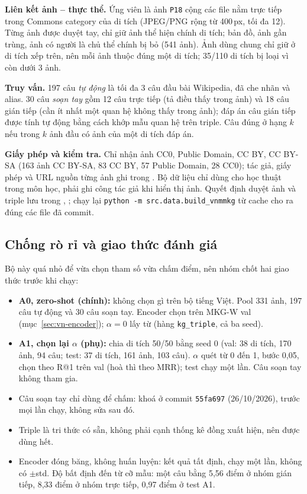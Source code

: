 \textbf{Liên kết ảnh -- thực thể.} Ứng viên là ảnh \texttt{P18} cộng các file nằm trực tiếp trong Commons category
của di tích (JPEG/PNG rộng từ 400\,px, tối đa 12). Từng ảnh được duyệt tay, chỉ giữ ảnh thể hiện chính di tích;
bản đồ, ảnh gần trùng, ảnh có người là chủ thể chính bị bỏ (541 ảnh). Ảnh dùng chung chỉ giữ ở di tích xếp trên,
nên mỗi ảnh thuộc đúng một di tích; 35/110 di tích bị loại vì còn dưới 3 ảnh.

\textbf{Truy vấn.} 197 câu \emph{tự động} là tối đa 3 câu đầu bài Wikipedia, đã che nhãn và alias. 30 câu
\emph{soạn tay} gồm 12 câu trực tiếp (tả điều thấy trong ảnh) và 18 câu gián tiếp (cần ít nhất một quan hệ không
thấy trong ảnh); đáp án câu gián tiếp được tính tự động bằng cách khớp mẫu quan hệ trên triple. Câu đúng ở hạng
$k$ nếu trong $k$ ảnh đầu có ảnh của một di tích đáp án.

\textbf{Giấy phép và kiểm tra.} Chỉ nhận ảnh CC0, Public Domain, CC BY, CC BY-SA (163 ảnh CC BY-SA, 83 CC BY, 57
Public Domain, 28 CC0); tác giả, giấy phép và URL nguồn từng ảnh ghi trong . Bộ dữ liệu chỉ
dùng cho học thuật trong môn học, phải ghi công tác giả khi hiển thị ảnh. Quyết định duyệt ảnh và triple lưu
trong , ; chạy lại \texttt{python -m src.data.build\_vnmmkg}
từ cache cho ra đúng các file đã commit.

\subsection{Chống rò rỉ và giao thức đánh giá}\label{sec:vn-leak}

Bộ này quá nhỏ để vừa chọn tham số vừa chấm điểm, nên nhóm chốt hai giao thức trước khi chạy:
\begin{itemize}
\item \textbf{A0, zero-shot (chính):} không chọn gì trên bộ tiếng Việt. Pool 331 ảnh, 197 câu tự động và 30 câu
  soạn tay. Encoder chọn trên MKG-W val (mục~\ref{sec:vn-encoder}); $\alpha=0$ lấy từ
   (hàng \texttt{kg\_triple}, cả ba seed).
\item \textbf{A1, chọn lại $\alpha$ (phụ):} chia di tích 50/50 bằng seed 0 (val: 38 di tích, 170 ảnh, 94 câu; test:
  37 di tích, 161 ảnh, 103 câu). $\alpha$ quét từ 0 đến 1, bước 0{,}05, chọn theo R@1 trên val (hoà thì theo
  MRR); test chạy một lần. Câu soạn tay không tham gia.
\item Câu soạn tay chỉ dùng để chấm:  khoá ở commit \texttt{55fa697} (26/10/2026), trước
  mọi lần chạy, không sửa sau đó.
\item Triple là tri thức có sẵn, không phải cạnh thống kê đồng xuất hiện, nên được dùng hết.
\item Encoder đóng băng, không huấn luyện: kết quả tất định, chạy một lần, không có $\pm$std. Độ bất định đến từ cỡ
  mẫu: một câu bằng 5{,}56 điểm ở nhóm gián tiếp, 8{,}33 điểm ở nhóm trực tiếp, 0{,}97 điểm ở test A1.
\end{itemize}


